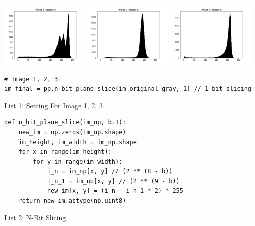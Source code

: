 \documentclass[titlepage]{article}
\begin{document}
\begin{center}
\includegraphics[width=0.32\textwidth]{img_1_hist.png}
\includegraphics[width=0.32\textwidth]{img_2_hist.png}
\includegraphics[width=0.32\textwidth]{img_3_hist.png}
\end{center}

\begin{listing}
\begin{verbatim}
# Image 1, 2, 3
im_final = pp.n_bit_plane_slice(im_original_gray, 1) // 1-bit slicing
\end{verbatim}
\centering
\caption{List 1: Setting For Image 1, 2, 3}
\newline
\end{listing}

\begin{listing}
\begin{verbatim}
def n_bit_plane_slice(im_np, b=1):
    new_im = np.zeros(im_np.shape)
    im_height, im_width = im_np.shape
    for x in range(im_height):
        for y in range(im_width):
            i_n = im_np[x, y] // (2 ** (8 - b))
            i_n_1 = im_np[x, y] // (2 ** (9 - b))
            new_im[x, y] = (i_n - i_n_1 * 2) * 255
    return new_im.astype(np.uint8)
\end{verbatim}
\centering
\caption{List 2: N-Bit Slicing}
\newline
\end{listing}
\end{document}
